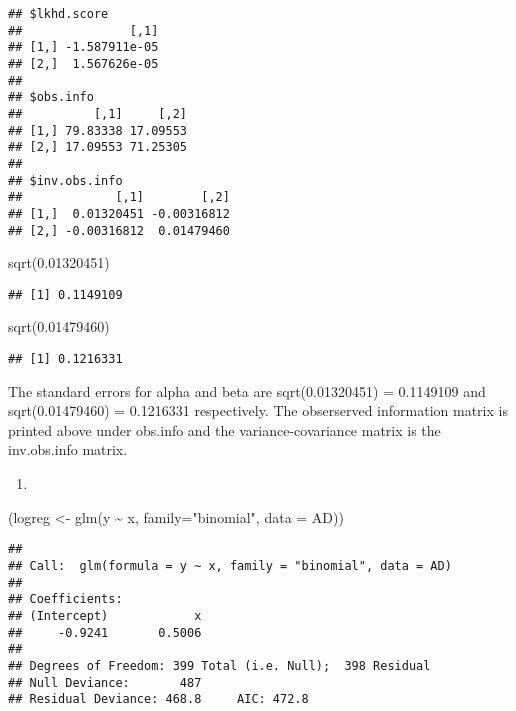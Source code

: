 \documentclass[
]{article}
\newenvironment{Shaded}{\begin{snugshade}}{\end{snugshade}}
\newcommand{\AttributeTok}[1]{\textcolor[rgb]{0.77,0.63,0.00}{#1}}
\newcommand{\FloatTok}[1]{\textcolor[rgb]{0.00,0.00,0.81}{#1}}
\newcommand{\FunctionTok}[1]{\textcolor[rgb]{0.00,0.00,0.00}{#1}}
\newcommand{\NormalTok}[1]{#1}
\newcommand{\OtherTok}[1]{\textcolor[rgb]{0.56,0.35,0.01}{#1}}
\newcommand{\SpecialCharTok}[1]{\textcolor[rgb]{0.00,0.00,0.00}{#1}}
\newcommand{\StringTok}[1]{\textcolor[rgb]{0.31,0.60,0.02}{#1}}
\providecommand{\tightlist}{%
  \setlength{\itemsep}{0pt}\setlength{\parskip}{0pt}}
\begin{document}
\begin{verbatim}
## $lkhd.score
##               [,1]
## [1,] -1.587911e-05
## [2,]  1.567626e-05
## 
## $obs.info
##          [,1]     [,2]
## [1,] 79.83338 17.09553
## [2,] 17.09553 71.25305
## 
## $inv.obs.info
##             [,1]        [,2]
## [1,]  0.01320451 -0.00316812
## [2,] -0.00316812  0.01479460
\end{verbatim}

\begin{Shaded}
\begin{Highlighting}[]
\FunctionTok{sqrt}\NormalTok{(}\FloatTok{0.01320451}\NormalTok{)}
\end{Highlighting}
\end{Shaded}

\begin{verbatim}
## [1] 0.1149109
\end{verbatim}

\begin{Shaded}
\begin{Highlighting}[]
\FunctionTok{sqrt}\NormalTok{(}\FloatTok{0.01479460}\NormalTok{) }
\end{Highlighting}
\end{Shaded}

\begin{verbatim}
## [1] 0.1216331
\end{verbatim}

The standard errors for alpha and beta are sqrt(0.01320451) = 0.1149109
and sqrt(0.01479460) = 0.1216331 respectively. The obserserved
information matrix is printed above under obs.info and the
variance-covariance matrix is the inv.obs.info matrix.

\begin{enumerate}
\def\labelenumi{\alph{enumi})}
\setcounter{enumi}{4}
\tightlist
\item
\end{enumerate}

\begin{Shaded}
\begin{Highlighting}[]
\NormalTok{(logreg }\OtherTok{\textless{}{-}} \FunctionTok{glm}\NormalTok{(y }\SpecialCharTok{\textasciitilde{}}\NormalTok{ x, }\AttributeTok{family=}\StringTok{"binomial"}\NormalTok{, }\AttributeTok{data =}\NormalTok{ AD))}
\end{Highlighting}
\end{Shaded}

\begin{verbatim}
## 
## Call:  glm(formula = y ~ x, family = "binomial", data = AD)
## 
## Coefficients:
## (Intercept)            x  
##     -0.9241       0.5006  
## 
## Degrees of Freedom: 399 Total (i.e. Null);  398 Residual
## Null Deviance:       487 
## Residual Deviance: 468.8     AIC: 472.8
\end{verbatim}
\end{document}

